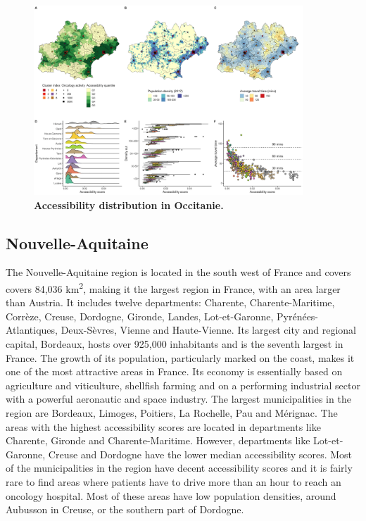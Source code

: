 \begin{figure}[H]
    \includegraphics[width=0.9\textwidth]{images/camion/region_accessibility/accessibility_Occitanie.png}
    \centering
    \caption{
        \textbf{Accessibility distribution in Occitanie.}
    }
\end{figure}

\subsection*{Nouvelle-Aquitaine}

The Nouvelle-Aquitaine region is located in the south west of France and covers
covers 84,036 km\textsuperscript{2}, making it the largest region in France,
with an area larger than Austria. It includes twelve departments: Charente,
Charente-Maritime, Corrèze, Creuse, Dordogne, Gironde, Landes, Lot-et-Garonne,
Pyrénées-Atlantiques, Deux-Sèvres, Vienne and Haute-Vienne. Its largest city and
regional capital, Bordeaux, hosts over 925,000 inhabitants and is the seventh
largest in France. The growth of its population, particularly marked on the
coast, makes it one of the most attractive areas in France. Its economy is
essentially based on agriculture and viticulture, shellfish farming and on a
performing industrial sector with a powerful aeronautic and space industry. The
largest municipalities in the region are Bordeaux, Limoges, Poitiers, La
Rochelle, Pau and Mérignac. The areas with the highest accessibility scores are
located in departments like Charente, Gironde and Charente-Maritime. However,
departments like Lot-et-Garonne, Creuse and Dordogne have the lower median
accessibility scores. Most of the municipalities in the region have decent
accessibility scores and it is fairly rare to find areas where patients have to
drive more than an hour to reach an oncology hospital. Most of these areas have
low population densities, around Aubusson in Creuse, or the southern part of
Dordogne.


